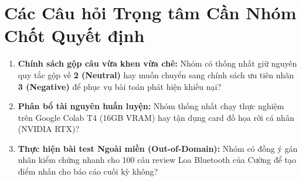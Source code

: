 \documentclass[11pt,a4paper]{article}
\begin{document}
\section{Các Câu hỏi Trọng tâm Cần Nhóm Chốt Quyết định}
\begin{enumerate}
    \item \textbf{Chính sách gộp câu vừa khen vừa chê:} Nhóm có thống nhất giữ nguyên quy tắc gộp về \textbf{2 (Neutral)} hay muốn chuyển sang chính sách ưu tiên nhãn \textbf{3 (Negative)} để phục vụ bài toán phát hiện khiếu nại?
    \item \textbf{Phân bổ tài nguyên huấn luyện:} Nhóm thống nhất chạy thực nghiệm trên Google Colab T4 (16GB VRAM) hay tận dụng card đồ họa rời cá nhân (NVIDIA RTX)?
    \item \textbf{Thực hiện bài test Ngoài miền (Out-of-Domain):} Nhóm có đồng ý gán nhãn kiểm chứng nhanh cho 100 câu review Loa Bluetooth của Cường để tạo điểm nhấn cho báo cáo cuối kỳ không?
\end{enumerate}
\end{document}
